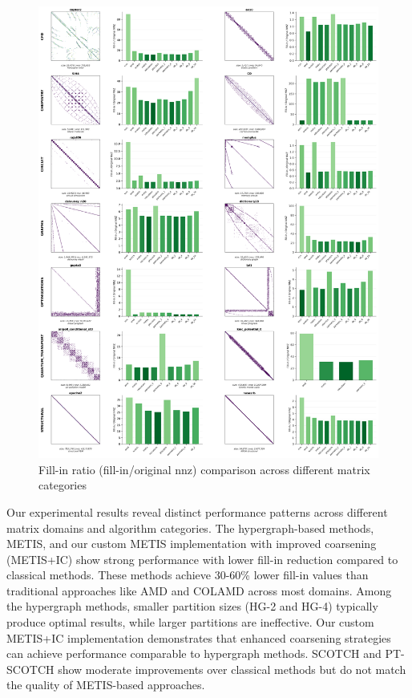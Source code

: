 \begin{figure}[H]
\centering
\includegraphics[width=1\textwidth]{fig/res/fillin_all_categories.png}
\caption{Fill-in ratio (fill-in/original nnz) comparison across different matrix categories}
\label{fig:fillin-categories}
\end{figure}

Our experimental results reveal distinct performance patterns across different matrix domains and algorithm categories. The hypergraph-based methods, METIS, and our custom METIS implementation with improved coarsening (METIS+IC) show strong performance with lower fill-in reduction compared to classical methods. These methods achieve 30-60\% lower fill-in values than traditional approaches like AMD and COLAMD across most domains. Among the hypergraph methods, smaller partition sizes (HG-2 and HG-4) typically produce optimal results, while larger partitions are ineffective. Our custom METIS+IC implementation demonstrates that enhanced coarsening strategies can achieve performance comparable to hypergraph methods. SCOTCH and PT-SCOTCH show moderate improvements over classical methods but do not match the quality of METIS-based approaches.

